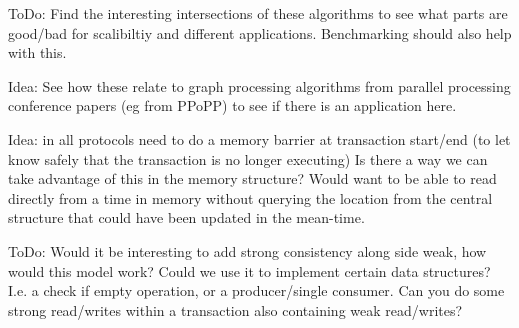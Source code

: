 \documentclass[11pt,letterpaper]{article}
\begin{document}
ToDo:  Find the interesting intersections of these algorithms to see what parts are good/bad
for scalibiltiy and different applications.
Benchmarking should also help with this.

Idea:  See how these relate to graph processing algorithms from parallel processing
conference papers (eg from PPoPP) to see if there is an application here.


Idea: in all protocols need to do a memory barrier at transaction start/end (to let know safely that the transaction is no longer executing)
Is there a way we can take advantage of this in the memory structure?
Would want to be able to read directly from a time in memory without querying the location from the central structure that could have been updated
in the mean-time.


ToDo: Would it be interesting to add strong consistency along side weak, how would this model work?  Could we use it to implement
certain data structures?
I.e. a check if empty operation, or a producer/single consumer.
Can you do some strong read/writes within a transaction also containing weak read/writes?
\end{document}
